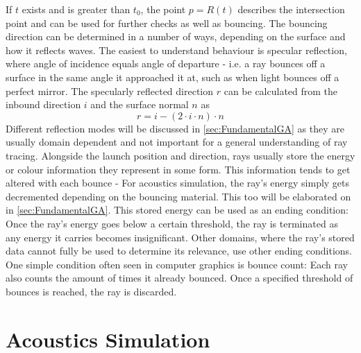 If \(t\) exists and is greater than \(t_0\),
the point \(p = R(t)\) describes the intersection point and can be used for further checks
as well as bouncing.
\newline
The bouncing direction can be determined in a number of ways,
depending on the surface and how it reflects waves.
The easiest to understand behaviour is specular reflection,
where angle of incidence equals angle of departure -
i.e. a ray bounces off a surface in the same angle it approached it at,
such as when light bounces off a perfect mirror.
The specularly reflected direction \(r\) can be calculated from the inbound direction \(i\) and the surface normal \(n\) as
\begin{equation}\label{eq:SpecularReflection}
    r = i - (2 \cdot i \cdot n) \cdot n
\end{equation}
Different reflection modes will be discussed in \autoref{sec:FundamentalGA} as they are usually domain dependent
and not important for a general understanding of ray tracing.
\newline
Alongside the launch position and direction,
rays usually store the energy or colour information they represent in some form.
This information tends to get altered with each bounce -
For acoustics simulation, the ray's energy simply gets decremented depending on the bouncing material.
This too will be elaborated on in \autoref{sec:FundamentalGA}.
\newline
This stored energy can be used as an ending condition:
Once the ray's energy goes below a certain threshold,
the ray is terminated as any energy it carries becomes insignificant.
Other domains, where the ray's stored data cannot fully be used to determine its relevance,
use other ending conditions.
One simple condition often seen in computer graphics is bounce count:
Each ray also counts the amount of times it already bounced.
Once a specified threshold of bounces is reached, the ray is discarded.

\section{Acoustics Simulation}\label{sec:FundamentalAcoustics}

